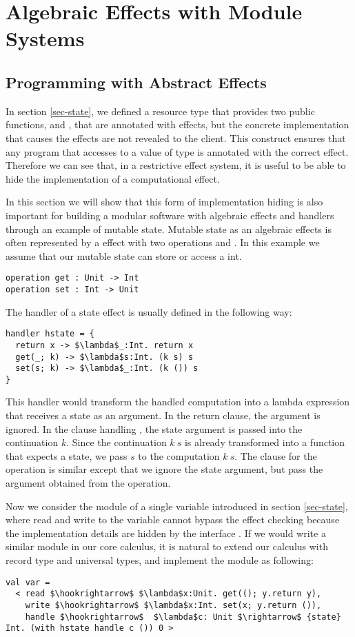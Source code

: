 
\chapter{Algebraic Effects with Module Systems}

\section{Programming with Abstract Effects}
In section \ref{sec-state}, we defined a resource type  that provides two public functions,  and , that are annotated with effects, but the concrete implementation that causes the effects are not revealed to the client. This construct ensures that any program that accesses to a value of type  is annotated with the correct effect. Therefore we can see that, in a restrictive effect system, it is useful to be able to hide the implementation of a computational effect.  

In this section we will show that this form of implementation hiding is also important for building a modular software with algebraic effects and handlers through an example of mutable state. Mutable state as an algebraic effects is often represented by a  effect with two operations  and . In this example we assume that our mutable state can store or access a int.
\begin{lstlisting}
operation get : Unit -> Int
operation set : Int -> Unit
\end{lstlisting}

The handler of a state effect is usually defined in the following way:
\begin{lstlisting}[mathescape=true]
handler hstate = {
  return x -> $\lambda$_:Int. return x
  get(_; k) -> $\lambda$s:Int. (k s) s
  set(s; k) -> $\lambda$_:Int. (k ()) s
}
\end{lstlisting}
This handler would transform the handled computation into a lambda expression that receives a state as an argument. In the return clause, the argument is ignored. In the clause handling ,  the state argument is passed into the continuation $k$. Since the continuation $k\ s$ is already transformed into a function that expects a state, we pass $s$ to the computation $k\ s$. The clause for the  operation is similar except that we ignore the state argument, but pass the argument obtained from the  operation. 

Now we consider the module of a single variable introduced in section \ref{sec-state}, where read and write to the variable cannot bypass the effect checking because the implementation details are hidden by the interface . If we would write a similar module in our core calculus, it is natural to extend our calculus with record type and universal types, and implement the module as following:
\begin{lstlisting}[mathescape=true]
val var = 
  < read $\hookrightarrow$ $\lambda$x:Unit. get((); y.return y),
    write $\hookrightarrow$ $\lambda$x:Int. set(x; y.return ()),
    handle $\hookrightarrow$  $\lambda$c: Unit $\rightarrow$ {state} Int. (with hstate handle c ()) 0 >
\end{lstlisting}

